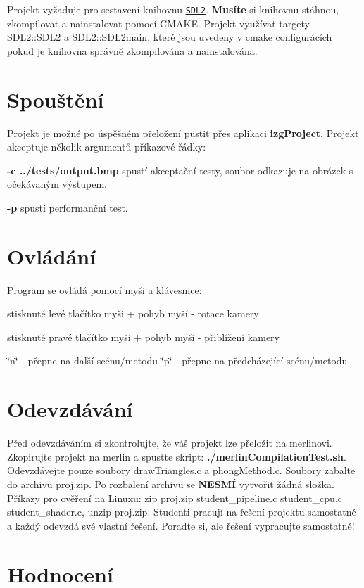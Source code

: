 Projekt vyžaduje pro sestavení knihovnu \href{https://www.libsdl.org/download-2.0.php}{\tt S\+D\+L2}. {\bfseries Musíte} si knihovnu stáhnou, zkompilovat a nainstalovat pomocí C\+M\+A\+KE. Projekt využívat targety S\+D\+L2\+::\+S\+D\+L2 a S\+D\+L2\+::\+S\+D\+L2main, které jsou uvedeny v cmake configurácích pokud je knihovna správně zkompilována a nainstalována.\hypertarget{index_spousteni}{}\section{Spouštění}\label{index_spousteni}
Projekt je možné po úspěšném přeložení pustit přes aplikaci {\bfseries izg\+Project}. Projekt akceptuje několik argumentů příkazové řádky\+:
\begin{DoxyItemize}
\item {\bfseries -\/c ../tests/output.bmp} spustí akceptační testy, soubor odkazuje na obrázek s očekávaným výstupem.
\item {\bfseries -\/p} spustí performanční test.
\end{DoxyItemize}\hypertarget{index_ovladani}{}\section{Ovládání}\label{index_ovladani}
Program se ovládá pomocí myši a klávesnice\+:
\begin{DoxyItemize}
\item stisknuté levé tlačítko myši + pohyb myší -\/ rotace kamery
\item stisknuté pravé tlačítko myši + pohyb myší -\/ přiblížení kamery
\item \char`\"{}n\char`\"{} -\/ přepne na další scénu/metodu \char`\"{}p\char`\"{} -\/ přepne na předcházející scénu/metodu
\end{DoxyItemize}\hypertarget{index_odevzdavani}{}\section{Odevzdávání}\label{index_odevzdavani}
Před odevzdáváním si zkontrolujte, že váš projekt lze přeložit na merlinovi. Zkopirujte projekt na merlin a spusťte skript\+: {\bfseries ./merlin\+Compilation\+Test.sh}. Odevzdávejte pouze soubory draw\+Triangles.\+c a phong\+Method.\+c. Soubory zabalte do archivu proj.\+zip. Po rozbalení archivu se {\bfseries N\+E\+S\+MÍ} vytvořit žádná složka. Příkazy pro ověření na Linuxu\+: zip proj.\+zip student\+\_\+pipeline.\+c student\+\_\+cpu.\+c student\+\_\+shader.\+c, unzip proj.\+zip. Studenti pracují na řešení projektu samostatně a každý odevzdá své vlastní řešení. Poraďte si, ale řešení vypracujte samostatně!\hypertarget{index_hodnoceni}{}\section{Hodnocení}\label{index_hodnoceni}
